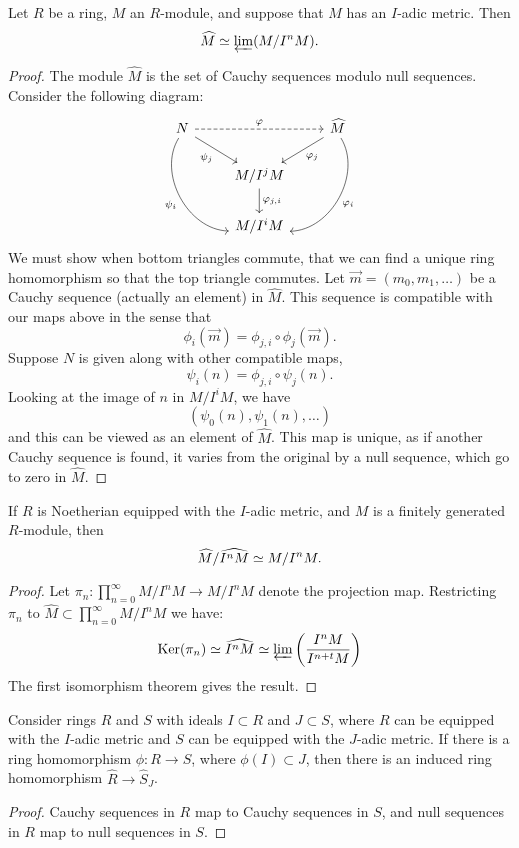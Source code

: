 \documentclass{ximera}
\begin{document}
\begin{theorem}
  Let $R$ be a ring, $M$ an $R$-module, and suppose that $M$ has an
  $I$-adic metric. Then
  \[
  \widehat{M} \simeq \varprojlim(M/I^n M).
  \]
  \begin{proof}
    The module $\hat{M}$ is the set of Cauchy sequences modulo null
    sequences.  Consider the following diagram:
    \[
    \begin{tikzcd}
      N\ar[ddr,bend right=60,swap,"\psi_i"] \ar[dr,swap,"\psi_j"]  \ar[dashed,rr,"\ph"] &   &  \hat{M} \ar[ddl,bend left=60,"\ph_i"] \ar[dl,"\ph_j"]\\
      & M/I^jM \ar[d,"\ph_{j,i}"] &\\
      & M/I^iM &
    \end{tikzcd}
    \]
    We must show when bottom triangles commute, that we can find a
    unique ring homomorphism so that the top triangle commutes. Let
    $\vec{m}=(m_0,m_1,\dots)$ be a Cauchy sequence (actually an element) in
    $\hat{M}$. This sequence is compatible with our maps above in
    the sense that
    \[
    \phi_i(\vec{m}) = \phi_{j,i} \circ \phi_j(\vec{m}).
    \]
    Suppose $N$ is given along with other compatible maps,
    \[
    \psi_i(n) = \phi_{j,i}\circ \psi_j(n).
    \]
    Looking at the image of $n$ in $M/I^iM$, we have
    \[
    (\psi_0(n), \psi_1(n),\dots)
    \]
    and this can be viewed as an element of $\hat{M}$. This map is
    unique, as if another Cauchy sequence is found, it varies from the
    original by a null sequence, which go to zero in $\hat{M}$.
  \end{proof}
\end{theorem}


\begin{corollary}\label{C:quotcomp}
  If $R$ is Noetherian equipped with the $I$-adic metric, and $M$ is a
  finitely generated $R$-module, then
  \[
  \widehat{M}/\widehat{I^n M} \simeq M/I^n M.
  \]
  \begin{proof}
    Let $\pi_n:\prod_{n=0}^\infty M/I^nM \to M/I^nM$ denote the
    projection map.  Restricting $\pi_n$ to $\hat{M} \subset
    \prod_{n=0}^\infty M/I^nM$ we have:
    \[
    \mathop{\mathrm{Ker}}\nolimits(\pi_n) \simeq \widehat{I^n M} \simeq \varprojlim \left(\frac{I^n M}{I^{n+t}M}\right)
    \]
    The first isomorphism theorem gives the result.
  \end{proof}
\end{corollary}





\begin{proposition}
  Consider rings $R$ and $S$ with ideals $I\subset R$ and $J\subset
  S$, where $R$ can be equipped with the $I$-adic metric and $S$ can
  be equipped with the $J$-adic metric. If there is a ring
  homomorphism $\phi:R \to S$, where $\phi(I) \subset J$, then there
  is an induced ring homomorphism $\hat{R}\to \hat{S}_J$.
  \begin{proof}
    Cauchy sequences in $R$ map to Cauchy sequences in $S$, and null
    sequences in $R$ map to null sequences in $S$.
  \end{proof}
\end{proposition}
\end{document}
